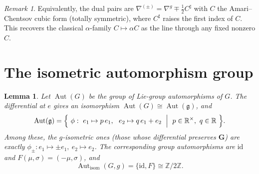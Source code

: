 \documentclass{amsart}
\newtheorem{lemma}{Lemma}
\theoremstyle{definition}
\theoremstyle{remark}
\newtheorem{remark}{Remark}
\begin{document}
\begin{remark}
Equivalently, the dual pairs are $\nabla^{(\pm)}=\nabla^g\mp\tfrac12 C^{\sharp}$ with $C$ the Amari--Chentsov
cubic form (totally symmetric), where $C^{\sharp}$ raises the first index of $C$. This recovers the classical
$\alpha$-family $C\mapsto\alpha C$ as the line through any fixed nonzero $C$.
\end{remark}

\section{The isometric automorphism group}\label{sec:aut}

\begin{lemma}\label{lem:aut}
Let $\operatorname{Aut}(G)$ be the group of Lie-group automorphisms of $G$. The differential at $e$ gives an
isomorphism $\operatorname{Aut}(G)\cong\operatorname{Aut}(\mathfrak g)$, and
\[
\operatorname{Aut}(\mathfrak g)=\Bigl\{\ \phi:\ e_1\mapsto p\,e_1,\ \ e_2\mapsto q\,e_1+e_2\ \Bigm|\ p\in\mathbb R^\times,\ q\in\mathbb R\ \Bigr\}.
\]
Among these, the $g$-isometric ones (those whose differential preserves $\mathbf G$) are exactly
$\phi_{\pm}:e_1\mapsto\pm e_1,\ e_2\mapsto e_2$. The corresponding group automorphisms are $\mathrm{id}$ and
$F(\mu,\sigma)=(-\mu,\sigma)$, and
\[
\operatorname{Aut}_{\mathrm{isom}}(G,g)=\{\mathrm{id},F\}\cong\mathbb{Z}/2\mathbb{Z}.
\]
\end{lemma}
\end{document}
